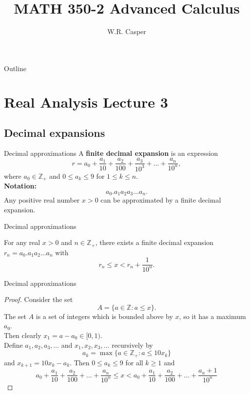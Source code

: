 \documentclass{beamer}
\title{MATH 350-2 Advanced Calculus}
\subtitle
{} %
\author[W.R. Casper] %
{W.R. Casper}
\institute[California State University Fullerton] %
{
  Department of Mathematics\\
  California State University Fullerton}
\begin{document}
\begin{frame}
  \titlepage
\end{frame}

\begin{frame}{Outline}
  \tableofcontents
\end{frame}



\section{Real Analysis Lecture 3}

\subsection{Decimal expansions}

\begin{frame}{Decimal approximations}
A \textbf{finite decimal expansion} is an expression
$$r = a_0 + \frac{a_1}{10} + \frac{a_2}{100} + \frac{a_3}{10^3} + \dots + \frac{a_n}{10^n},$$
where $a_0\in\mathbb Z_+$ and $0\leq a_k\leq 9$ for $1\leq k\leq n$.\\
\pause
\textbf{Notation:}
$$a_0.a_1a_2a_3\dots a_n.$$
\pause
Any positive real number $x>0$ can be approximated by a finite decimal expansion.
\end{frame}

\begin{frame}{Decimal approximations}
\begin{thm}
For any real $x > 0$ and $n\in \mathbb{Z}_+$, there exists a finite decimal expansion $r_n=a_0.a_1a_2\dots a_n$ with
$$r_n \leq x < r_n + \frac{1}{10^n}.$$
\end{thm}
\end{frame}

\begin{frame}{Decimal approximations}
\begin{proof}
Consider the set
$$A = \{a\in\mathbb{Z}: a\leq x\}.$$
\pause
The set $A$ is a set of integers which is bounded above by $x$, so it has a maximum $a_0$. \\
\pause
Then clearly $x_1 = a-a_0\in [0,1)$. \\
\pause
Define $a_1,a_2,a_3,\dots$ and $x_1,x_2,x_3,\dots$ recursively by
$$a_k = \max\{a\in\mathbb{Z}_+: a\leq 10x_{k}\}$$
and $x_{k+1}=10x_k-a_k$.
\pause
Then $0\leq a_k \leq 9$ for all $k\geq 1$ 
\pause
and 
$$a_0 + \frac{a_1}{10} + \frac{a_2}{100} + \dots + \frac{a_n}{10^n}
\leq x < a_0 + \frac{a_1}{10} + \frac{a_2}{100} + \dots + \frac{a_n+1}{10^n}
$$
\end{proof}
\end{frame}
\end{document}
